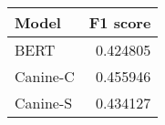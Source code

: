\begin{tabular}{lr}
\toprule
   Model &  F1 score \\
\midrule
    BERT &  0.424805 \\
Canine-C &  0.455946 \\
Canine-S &  0.434127 \\
\bottomrule
\end{tabular}
